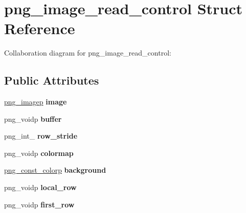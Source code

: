 \hypertarget{structpng__image__read__control}{\section{png\+\_\+image\+\_\+read\+\_\+control Struct Reference}
\label{structpng__image__read__control}
}


Collaboration diagram for png\+\_\+image\+\_\+read\+\_\+control\+:
\subsection*{Public Attributes}
\begin{DoxyCompactItemize}
\item 
\hypertarget{structpng__image__read__control_a303c182f2fd25572d886b405c50ded36}{\hyperlink{structpng__image}{png\+\_\+imagep} {\bfseries image}}\label{structpng__image__read__control_a303c182f2fd25572d886b405c50ded36}

\item 
\hypertarget{structpng__image__read__control_a352cfd88a2209d6280999fead1df6916}{png\+\_\+voidp {\bfseries buffer}}\label{structpng__image__read__control_a352cfd88a2209d6280999fead1df6916}

\item 
\hypertarget{structpng__image__read__control_a208248176819e1320a7f4ea4c6594ba0}{png\+\_\+int\+\_ {\bfseries row\+\_\+stride}}\label{structpng__image__read__control_a208248176819e1320a7f4ea4c6594ba0}

\item 
\hypertarget{structpng__image__read__control_a81331646b05cbcf4dd75f3b337126dc7}{png\+\_\+voidp {\bfseries colormap}}\label{structpng__image__read__control_a81331646b05cbcf4dd75f3b337126dc7}

\item 
\hypertarget{structpng__image__read__control_a0bd8cdd6b864ab8c1f40519c19ba26dc}{\hyperlink{structpng__color__struct}{png\+\_\+const\+\_\+colorp} {\bfseries background}}\label{structpng__image__read__control_a0bd8cdd6b864ab8c1f40519c19ba26dc}

\item 
\hypertarget{structpng__image__read__control_a6eeb91a1255a2baae9a1f3981285939e}{png\+\_\+voidp {\bfseries local\+\_\+row}}\label{structpng__image__read__control_a6eeb91a1255a2baae9a1f3981285939e}

\item 
\hypertarget{structpng__image__read__control_a433feb427eae36d3d70e2eda98adec52}{png\+\_\+voidp {\bfseries first\+\_\+row}}\label{structpng__image__read__control_a433feb427eae36d3d70e2eda98adec52}


\end{DoxyCompactItemize}
